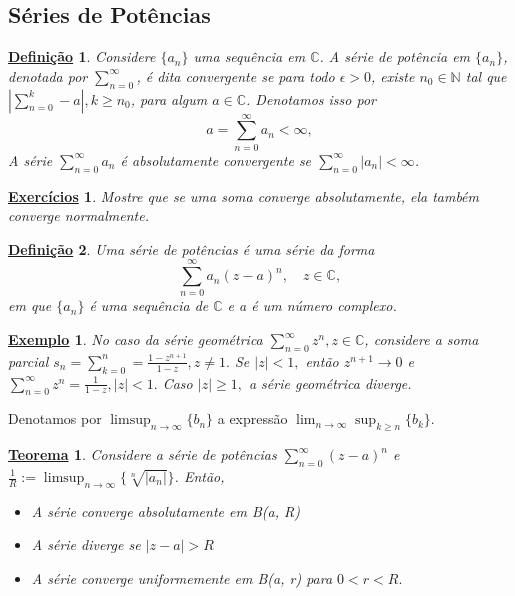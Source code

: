 \documentclass{article}
\newtheorem*{def*}{\underline{Defini\c c\~ao}}
\newtheorem*{theorem*}{\underline{Teorema}}
\newtheorem{example}{\underline{Exemplo}}[section]
\newtheorem*{exer*}{\underline{Exerc\'icios}}
\begin{document}
\subsection{S\'eries de Pot\^encias}
\begin{def*}
  Considere $\{a_{n}\}$ uma sequ\^encia em $\mathbb{C}$. A s\'erie de pot\^encia em $\{a_n\}$, denotada
por $\sum\limits_{n=0}^{\infty}$, \'e dita convergente se para todo $\epsilon > 0$, existe $n_0\in\mathbb{N}$
tal que $|\sum\limits_{n=0}^{k} - a|, k\geq{n_0}$, para algum $a\in\mathbb{C}$. Denotamos isso por 
  $$
  a = \sum_{n=0}^{\infty} a_n < \infty,
  $$
A s\'erie $\sum\limits_{n=0}^{\infty}a_n$ \'e absolutamente convergente se $\sum\limits_{n=0}^{\infty}|a_n|<\infty$.
\end{def*}
\begin{exer*}
  Mostre que se uma soma converge absolutamente, ela tamb\'em converge normalmente.
\end{exer*}
\begin{def*}
  Uma s\'erie de pot\^encias \'e uma s\'erie da forma
  $$
  \sum_{n=0}^{\infty}a_n(z-a)^n, \quad z\in\mathbb{C},
  $$
em que $\{a_n\}$ \'e uma sequ\^encia de $\mathbb{C}$ e a \'e um n\'umero complexo.
\end{def*}
\begin{example}
  No caso da s\'erie geom\'etrica $\sum\limits_{n=0}^{\infty}z^n, z\in\mathbb{C}$, considere
a soma parcial $s_n = \sum\limits_{k=0}^{n} = \frac{1 - z^{n+1}}{1-z}, z\neq{1}.$ Se
$|z| < 1,$ ent\~ao $z^{n+1}\to{0}$ e $\sum\limits_{n=0}^{\infty}z^n = \frac{1}{1-z}, |z| < 1.$
Caso $|z|\geq{1},$ a s\'erie geom\'etrica diverge.
\end{example}
Denotamos por $\limsup_{n\to\infty}\{b_n\}$ a express\~ao $\lim_{n\to\infty}\sup_{k\geq{n}}\{b_k\}$.
\begin{theorem*}
  Considere a s\'erie de pot\^encias $\sum\limits_{n=0}^{\infty}(z-a)^n$ e $\frac{1}{R}:=\limsup_{n\to\infty}\{\sqrt[n]{|a_n|}\}$.
Ent\~ao, 
\begin{itemize}
  \item[1)] A s\'erie converge absolutamente em B(a, R)
  \item[2)] A s\'erie diverge se $|z-a| > R$
  \item[3)] A s\'erie converge uniformemente em B(a, r) para $0 < r < R.$
\end{itemize}
\end{theorem*}
\end{document}
